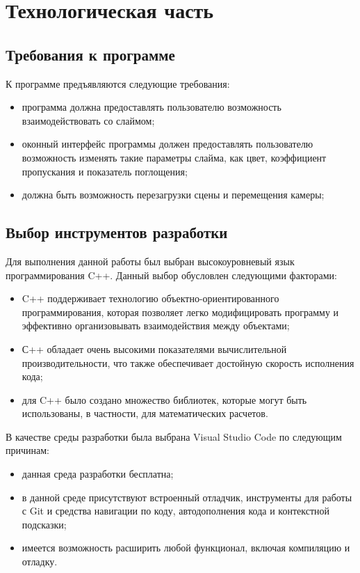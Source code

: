 \chapter{Технологическая часть}

\section{Требования к программе}

К программе предъявляются следующие требования:

\begin{itemize}
	\item программа должна предоставлять пользователю возможность взаимодействовать со слаймом;
	\item оконный интерфейс программы должен предоставлять пользователю возможность изменять такие параметры слайма, как цвет, коэффициент пропускания и показатель поглощения;
	\item должна быть возможность перезагрузки сцены и перемещения камеры;
\end{itemize}

\section{Выбор инструментов разработки}

Для выполнения данной работы был выбран высокоуровневый язык
программирования C++. Данный выбор обусловлен следующими факторами:

\begin{itemize}
	\item C++ поддерживает технологию объектно-ориентированного
	программирования, которая позволяет легко модифицировать программу и
	эффективно организовывать взаимодействия между объектами;
	\item С++ обладает очень высокими показателями вычислительной
	производительности, что также обеспечивает достойную скорость исполнения
	кода;
	\item для C++ было создано множество библиотек, которые могут быть
	использованы, в частности, для математических расчетов.
\end{itemize}

В качестве среды разработки была выбрана Visual Studio Code по
следующим причинам:

\begin{itemize}
	\item данная среда разработки бесплатна;
	\item в данной среде присутствуют встроенный отладчик, инструменты для
	работы с Git и средства навигации по коду, автодополнения кода и контекстной
	подсказки;
	\item имеется возможность расширить любой функционал, включая
	компиляцию и отладку.
\end{itemize}

